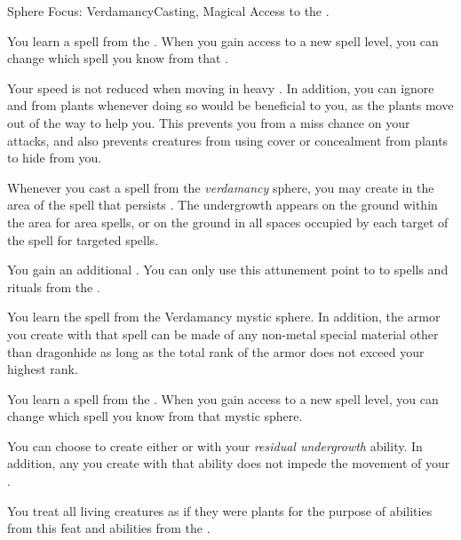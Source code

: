     \begin{feat}{Sphere Focus: Verdamancy}{Casting, Magical}
        \featpre Access to the  .

         You learn a spell from the  .
        When you gain access to a new spell level, you can change which spell you know from that .

         Your speed is not reduced when moving in heavy .
        In addition, you can ignore  and  from plants whenever doing so would be beneficial to you, as the plants move out of the way to help you.
        This prevents you from a miss chance on your attacks, and also prevents creatures from using cover or concealment from plants to hide from you.

         Whenever you cast a spell from the \textit{verdamancy} sphere, you may create  in the area of the spell that persists .
        The undergrowth appears on the ground within the area for area spells, or on the ground in all spaces occupied by each target of the spell for targeted spells.

         You gain an additional .
        You can only use this attunement point to  to spells and rituals from the  .

         You learn the  spell from the Verdamancy mystic sphere.
        In addition, the armor you create with that spell can be made of any non-metal special material other than dragonhide as long as the total rank of the armor does not exceed your highest rank.

         You learn a spell from the  .
        When you gain access to a new spell level, you can change which spell you know from that mystic sphere.

         You can choose to create either  or  with your \textit{residual undergrowth} ability.
        In addition, any  you create with that ability does not impede the movement of your .

         You treat all living creatures as if they were plants for the purpose of abilities from this feat and abilities from the  .
    \end{feat}

